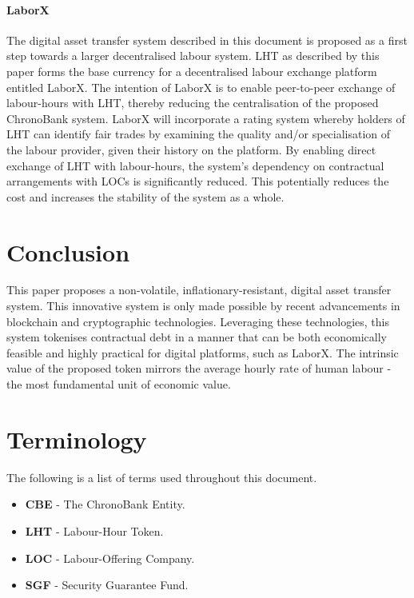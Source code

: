 \begin{multicols}{2}
\paragraph{LaborX}
The digital asset transfer system described in this document is proposed as a first step towards a larger decentralised labour system. LHT as described by this paper forms the base currency for a decentralised labour exchange platform entitled LaborX. The intention of LaborX is to enable peer-to-peer exchange of labour-hours with LHT, thereby reducing the centralisation of the proposed ChronoBank system. LaborX will incorporate a rating system whereby holders of LHT can identify fair trades by examining the quality and/or specialisation of the labour provider, given their history on the platform. By enabling direct exchange of LHT with labour-hours, the system's dependency on contractual arrangements with LOCs is significantly reduced. This potentially reduces the cost and increases the stability of the system as a whole.

\section{Conclusion}

This paper proposes a non-volatile, inflationary-resistant, digital asset transfer system. This innovative system is only made possible by recent advancements in blockchain and cryptographic technologies. Leveraging these technologies, this system tokenises contractual debt in a manner that can be both economically feasible and highly practical for digital platforms, such as LaborX. The intrinsic value of the proposed token mirrors the average hourly rate of human labour - the most fundamental unit of economic value.




\end{multicols}
\pagebreak
\appendix

\section{Terminology}
\label{sec:appendix:terminology}

The following is a list of terms used throughout this document.
\begin{itemize}
  \setlength\itemsep{2mm}
  \item \textbf{CBE} - The ChronoBank Entity.
  \item \textbf{LHT} - Labour-Hour Token.
  \item \textbf{LOC} - Labour-Offering Company.
  \item \textbf{SGF} - Security Guarantee Fund.
\end{itemize}

